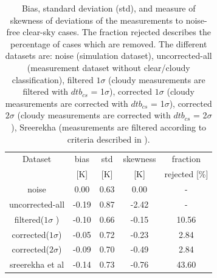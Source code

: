 \documentclass[12pt]{article}
\begin{document}
\begin{table}[!bt]
	\centering
	\begin{tabular}[b]{c|c|c|c|c}
		Dataset  		  &   bias &   std &   skewness  & fraction  \\
							&   [K]  &   [K] & [K] & rejected [\%]\\
		\hline
		noise             		&   0.00 &  0.63 &               0.00 &                - \\
		uncorrected-all       	&  -0.19 &  0.87 &              -2.42 &                - \\
		filtered($1\sigma$ ) 	&  -0.10 &  0.66 &              -0.15 &               10.56 \\
		corrected($1\sigma$) 	&  -0.05 &  0.72 &              -0.23 &                2.84 \\
		corrected($2\sigma$) 	&  -0.09 &  0.70 &              -0.49 &                2.84 \\
		sreerekha et al   		&  -0.14 &  0.73 &              -0.76 &               43.60 \\
		\hline
	\end{tabular}
	\caption{Bias, standard deviation (std), and measure of skewness of
      deviations of the measurements to noise-free clear-sky cases. The
      fraction rejected describes the percentage of cases which are removed.
      The different datasets are: noise (simulation dataset), uncorrected-all
      (measurement dataset without clear/cloudy classification), filtered
      $1\sigma$ (cloudy measurements are filtered with $dtb_{cs}$ = 1$\sigma$),
      corrected $1\sigma$ (cloudy measurements are corrected with $dtb_{cs}$ =
      1$\sigma$), corrected $2\sigma$ (cloudy measurements are corrected with
      $dtb_{cs}$ = 2$\sigma$), Sreerekha (measurements are filtered according
      to criteria described in \cite{rekha2012potential}). }
	\label{tab:correction:stats:34:42}
\end{table}
%
\end{document}
